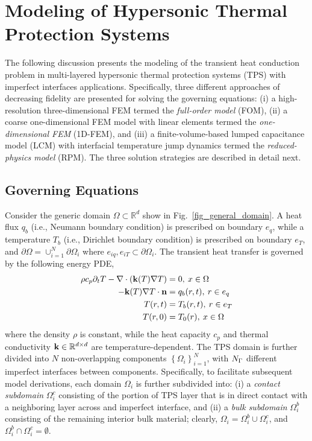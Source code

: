\section{Modeling of Hypersonic Thermal Protection Systems}

The following discussion presents the modeling of the transient heat conduction problem in multi-layered hypersonic thermal protection systems (TPS) with imperfect interfaces applications. Specifically, three different approaches of decreasing fidelity are presented for solving the governing equations: (i) a high-resolution three-dimensional FEM termed the \emph{full-order model} (FOM), (ii) a coarse one-dimensional FEM model with linear elements termed the \emph{one-dimensional FEM} (1D-FEM), and (iii) a finite-volume-based lumped capacitance model (LCM) with interfacial temperature jump dynamics termed the \emph{reduced-physics model} (RPM). The three solution strategies are described in detail next.

\subsection{Governing Equations}

Consider the generic domain $\Omega\subset\mathbb{R}^{d}$ show in Fig.~\ref{fig_general_domain}. A heat flux $q_b$ (i.e., Neumann boundary condition) is prescribed on boundary $e_q$, while a temperature $T_b$ (i.e., Dirichlet boundary condition) is prescribed on boundary $e_T$, and $\partial\Omega = \cup_{i=1}^{N}\partial\Omega_i$ where $e_{iq},e_{iT}\subset\partial\Omega_i$. The transient heat transfer is governed by the following energy PDE,
\begin{subequations}
 \begin{align}
    \rho c_p \partial_t T - \nabla\cdot\left(\mathbf{k}(T)\nabla T\right) &= 0, \: x\in\Omega\\
    -\mathbf{k}(T)\nabla T\cdot\mathbf{n} &= q_b(r,t), \: r\in e_q\\
    T(r,t) &= T_b(r,t), \: r\in e_T\\
    T(r,0) &= T_0(r), \: x\in\Omega
 \end{align}
 \label{eq:gen_eq}
\end{subequations}
\noindent where the density $\rho$ is constant, while the heat capacity $c_p$ and thermal conductivity $\mathbf{k}\in\mathbb{R}^{d\times d}$ are temperature-dependent. The TPS domain is further divided into $N$ non-overlapping components $\left\{\Omega_i\right\}_{i=1}^{N}$, with $N_{\Gamma}$ different imperfect interfaces between components. Specifically, to facilitate subsequent model derivations, each domain $\Omega_i$ is further subdivided into: (i) a \emph{contact subdomain} $\Omega_i^c$ consisting of the portion of TPS layer that is in direct contact with a neighboring layer across and imperfect interface, and (ii) a \emph{bulk subdomain} $\Omega_i^b$ consisting of the remaining interior bulk material; clearly, $\Omega_i = \Omega_i^b\cup\Omega_i^c$, and $\Omega_i^b\cap\Omega_i^c = \emptyset$.

